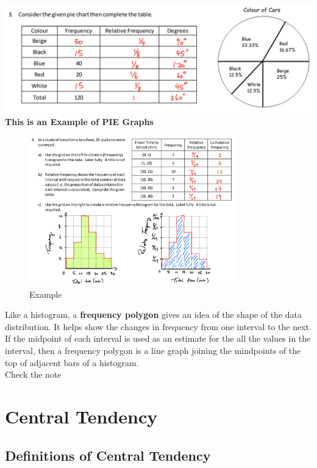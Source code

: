 \begin{example}
    \begin{center}
    \includegraphics[width=1\textwidth]{pictures/3.2.2.png}
    \textbf{This is an Example of PIE Graphs}
    \end{center}
\end{example}
\newpage
\begin{figure}[h!]
\centering
\includegraphics[width=0.8\textwidth]{pictures/3.2.3.png}
\caption{Example}
\end{figure}

Like a histogram, a \textbf{frequency polygon} gives an idea of the shape of the data distribution. It helps show the changes
in frequency from one interval to the next. If the midpoint of each interval is used as an estimate for the all the values in the 
interval, then a frequency polygon is a line graph joining the mindpoints of the top of adjacent bars of a histogram. \\

Check the note\\

\section{Central Tendency}
\subsection{Definitions of Central Tendency}
